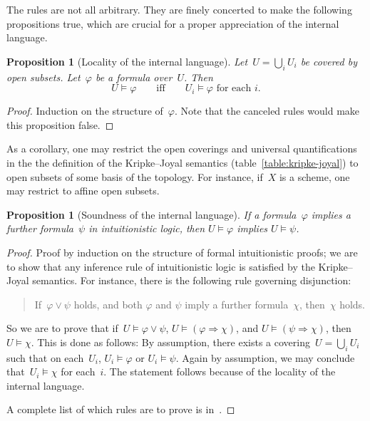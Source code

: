 \documentclass[10pt]{amsart}
\theoremstyle{definition}
\theoremstyle{plain}
\newtheorem{prop}[defn]{Proposition}
\theoremstyle{remark}
\newcommand{\?}{\,{:}\,}
\renewcommand{\_}{\mathpunct{.}\,}
\begin{document}
The rules are not all arbitrary. They are finely concerted to make the
following propositions true, which are crucial for a proper appreciation of the
internal language.

\begin{prop}[Locality of the internal language]
Let~$U = \bigcup_i U_i$ be covered by open subsets. Let~$\varphi$
be a formula over~$U$. Then
\[ U \models \varphi \qquad\text{iff}\qquad
  \text{$U_i \models \varphi$ for each $i$}. \]
\end{prop}
\begin{proof}Induction on the structure of~$\varphi$. Note that the canceled
rules would make this proposition false.\end{proof}

As a corollary, one may restrict the open coverings and universal
quantifications in the the definition of the Kripke--Joyal semantics
(table~\ref{table:kripke-joyal}) to open subsets of some basis of the topology.
For instance, if~$X$ is a scheme, one may restrict to affine open subsets.

\begin{prop}[Soundness of the internal language]
If a formula~$\varphi$ implies a further formula~$\psi$ in intuitionistic logic, then
$U \models \varphi$ implies $U \models \psi$.
\end{prop}
\begin{proof}
Proof by induction on the structure of formal intuitionistic proofs; we are to
show that any inference rule of intuitionistic logic is satisfied by the
Kripke--Joyal semantics. For instance, there is the following rule governing
disjunction:
\begin{quote}
If~$\varphi \vee \psi$ holds, and both $\varphi$ and $\psi$ imply a further
formula~$\chi$, then~$\chi$ holds.
\end{quote}
So we are to prove that if~$U \models \varphi \vee \psi$, $U \models (\varphi
\Rightarrow \chi)$, and $U \models (\psi \Rightarrow \chi)$, then $U \models \chi$.
This is done as follows: By assumption, there exists a covering~$U = \bigcup_i
U_i$ such that on each~$U_i$, $U_i \models \varphi$ or $U_i \models \psi$.
Again by assumption, we may conclude that~$U_i \models \chi$ for each~$i$. The statement
follows because of the locality of the internal language.

A complete list of which rules are to prove is
in~\cite[D1.3.1]{johnstone:elephant}.
\end{proof}
\end{document}
